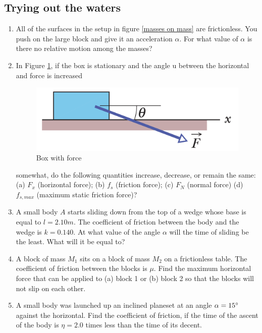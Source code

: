 \documentclass{article}
\begin{document}
\subsection{Trying out the waters}

\begin{enumerate}

\item All of the surfaces in the setup in figure \ref{masses on mass} are frictionless. You push on the large block and give it an acceleration $\alpha$. For what value of $\alpha$ is there no relative motion among the masses?

\item In Figure \ref{box with force}, if the box is stationary and the angle u between the horizontal and force is increased
\begin{figure}
    \centering
    \includegraphics[width=0.5\linewidth]{box with force.png}
    \caption{Box with force}
    \label{box with force}
\end{figure}
somewhat, do the following quantities increase, decrease, or remain the
same: (a) $F_x$ (horizontal force); (b) $f_s$ (friction force); (c) $F_N$ (normal force) (d) $f_{s,max}$ (maximum static friction force)?

\item A small body $A$ starts sliding down from the top of a wedge whose base is equal to $l = 2.10 m$. The coefficient of friction between the body and the wedge is $k = 0.140$. At what value of the angle $\alpha$ will the time of sliding be the least. What will it be equal to?

\item A block of mass $M_1$ sits on a block of mass $M_2$ on a frictionless table. The
coefficient of friction between the blocks is $\mu$. Find the maximum horizontal force that can be
applied to (a) block 1 or (b) block 2 so that the blocks will not slip on each other.

\item A small body was launched up an inclined planeset at an angle $\alpha = 15 \degree$ against the horizontal. Find the coefficient of friction, if the time of the ascent of the body is $\eta = 2.0$ times less than the time of its decent. 


\end{enumerate}
\end{document}
